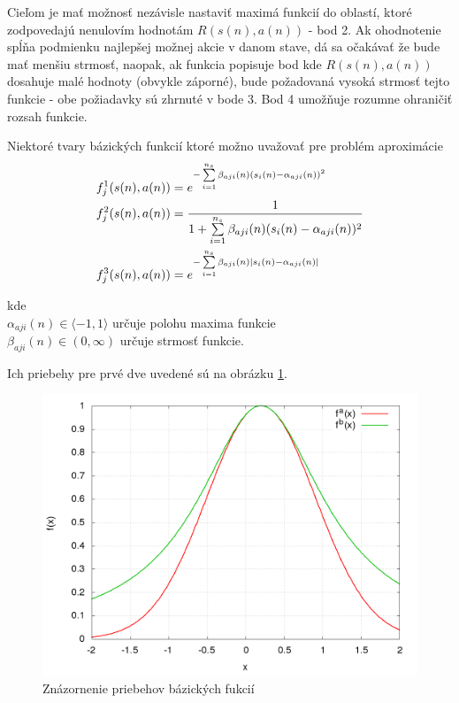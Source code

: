 Cieľom je mať možnosť nezávisle nastaviť maximá funkcií do oblastí, ktoré zodpovedajú
nenulovím hodnotám $R(s(n), a(n))$ - bod 2. Ak ohodnotenie spĺňa podmienku najlepšej
možnej akcie v danom stave, dá sa očakávať že bude mať menšiu strmosť, naopak, ak funkcia
popisuje bod kde $R(s(n), a(n))$ dosahuje malé hodnoty (obvykle záporné), bude požadovaná
vysoká strmosť tejto funkcie - obe požiadavky sú zhrnuté v bode 3. Bod 4 umožňuje rozumne
ohraničiť rozsah funkcie.

Niektoré tvary bázických funkcií ktoré možno uvažovať pre problém aproximácie
\begin{align}
    f_j^1(\boldmath{s(n), a(n)}) &= e^{ -\sum\limits_{i=1}^{n_s}{\beta_{aji}(n)(s_i(n) - \alpha_{aji}(n))^2} }  \\
    f_j^2(\boldmath{s(n), a(n)}) &= \frac{1}{1 + \sum\limits_{i=1}^{n_s}{\beta_{aji}(n)(s_i(n) - \alpha_{aji}(n))^2}}  \\
    f_j^3(\boldmath{s(n), a(n)}) &= e^{ -\sum\limits_{i=1}^{n_s}{\beta_{aji}(n)\mid s_i(n) - \alpha_{aji}(n) \mid} }
    \label{eq:basis_functions_01}
\end{align}

kde \\
$\alpha_{aji}(n) \in \langle -1, 1 \rangle$ určuje polohu maxima funkcie \\
$\beta_{aji}(n) \in (0, \infty)$ určuje strmosť funkcie.

Ich priebehy pre prvé dve uvedené sú na obrázku \ref{img:basis_funcions}.

\begin{figure}[]
\center
\includegraphics[scale=.4]{../pictures/gaussian_1D.png}
\caption{Znázornenie priebehov bázických fukcií}
\label{img:basis_funcions}
\end{figure}

